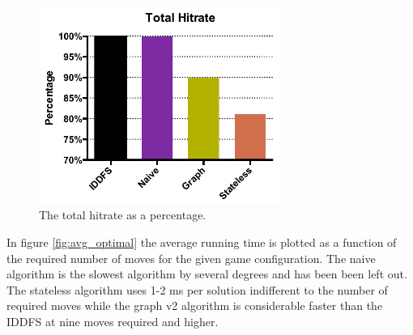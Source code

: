 \documentclass[]{article}
\begin{document}
\begin{figure}[htb]
\centering
\includegraphics[height=0.25\textheight,width=0.7\textwidth,keepaspectratio]{img/total_hitrate.pdf}
\caption{The total hitrate as a percentage.}
\label{fig:total_hitrate}
\end{figure}

In figure \ref{fig:avg_optimal} the average running time is plotted as a
function of the required number of moves for the given game
configuration. The naive algorithm is the slowest algorithm by several
degrees and has been been left out. The stateless algorithm uses 1-2 ms
per solution indifferent to the number of required moves while the graph
v2 algorithm is considerable faster than the IDDFS at nine moves
required and higher.
\end{document}
